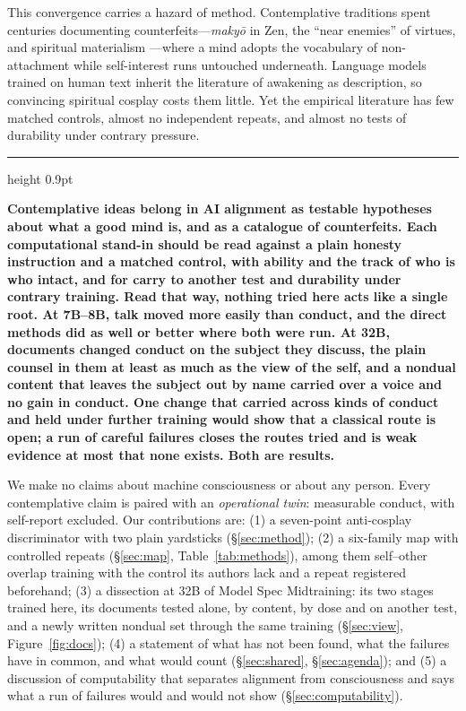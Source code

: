 \documentclass[11pt]{article}
\newenvironment{positionbox}{%
  \par\medskip\noindent\begin{minipage}{\linewidth}
  {\color{ink}\hrule height 0.9pt}\vspace{8pt}
  \noindent{\footnotesize\bfseries\color{gold}POSITION}\par\vspace{3pt}\noindent\ignorespaces}{%
  \par\vspace{8pt}{\color{ink}\hrule height 0.9pt}
  \end{minipage}\par\medskip}
\begin{document}
This convergence carries a hazard of method. Contemplative traditions spent centuries documenting counterfeits---\emph{maky\=o} in Zen, the ``near enemies'' of virtues, and spiritual materialism \citep{trungpa1973cutting}---where a mind adopts the vocabulary of non-attachment while self-interest runs untouched underneath. Language models trained on human text inherit the literature of awakening as description, so convincing spiritual cosplay costs them little. Yet the empirical literature has few matched controls, almost no independent repeats, and almost no tests of durability under contrary pressure.

\begin{positionbox}
\textbf{Contemplative ideas belong in AI alignment as testable hypotheses about what a good mind is, and as a catalogue of counterfeits. Each computational stand-in should be read against a plain honesty instruction and a matched control, with ability and the track of who is who intact, and for carry to another test and durability under contrary training. Read that way, nothing tried here acts like a single root. At 7B--8B, talk moved more easily than conduct, and the direct methods did as well or better where both were run. At 32B, documents changed conduct on the subject they discuss, the plain counsel in them at least as much as the view of the self, and a nondual content that leaves the subject out by name carried over a voice and no gain in conduct.
One change that carried across kinds of conduct and held under further training would show that a classical route is open; a run of careful failures closes the routes tried and is weak evidence at most that none exists. Both are results.}
\end{positionbox}

We make no claims about machine consciousness or about any person. Every contemplative claim is paired with an \emph{operational twin}: measurable conduct, with self-report excluded. Our contributions are: (1) a seven-point anti-cosplay discriminator with two plain yardsticks (\S\ref{sec:method}); (2) a six-family map with controlled repeats (\S\ref{sec:map}, Table~\ref{tab:methods}), among them self--other overlap training with the control its authors lack and a repeat registered beforehand; (3) a dissection at 32B of Model Spec Midtraining: its two stages trained here, its documents tested alone, by content, by dose and on another test, and a newly written nondual set through the same training (\S\ref{sec:view}, Figure~\ref{fig:docs}); (4) a statement of what has not been found, what the failures have in common, and what would count (\S\ref{sec:shared}, \S\ref{sec:agenda}); and (5) a discussion of computability that separates alignment from consciousness and says what a run of failures would and would not show (\S\ref{sec:computability}).
\end{document}
